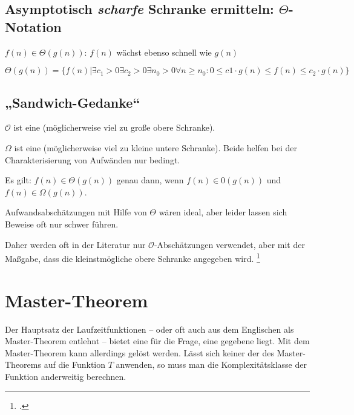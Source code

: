 \documentclass{lehramt-informatik-haupt}
\begin{document}
\subsection{Asymptotisch \emph{scharfe} Schranke ermitteln: $\Theta$-Notation}

\begin{compactitem}
\item $f(n) \in \Theta(g(n))$: $f(n)$ wächst ebenso schnell wie $g(n)$
\item $\Theta(g(n)) = \{f(n) |
\exists c_1 > 0
\exists c_2 > 0
\exists n_0 > 0
\forall n \geq n_0 :
 0 \leq c 1 \cdot g(n) \leq f(n) \leq c_2 \cdot g(n) \}$
\end{compactitem}

\subsection{„Sandwich-Gedanke“}

\begin{compactitem}
\item  $\mathcal{O}$ ist eine (möglicherweise viel zu große obere
Schranke).

\item  $\Omega$ ist eine (möglicherweise viel zu kleine untere
Schranke). Beide helfen bei der Charakterisierung von Aufwänden nur
bedingt.

\item  Es gilt: $f(n) \in \Theta(g(n))$ genau dann, wenn $f(n) \in
\mathcal{0}(g(n))$ und $f(n) \in \Omega(g(n))$.

\item  Aufwandsabschätzungen mit Hilfe von $\Theta$ wären ideal, aber
leider lassen sich Beweise oft nur schwer führen.
\end{compactitem}

Daher werden oft in der Literatur nur $\mathcal{O}$-Abschätzungen
verwendet, aber mit der Maßgabe, dass die kleinstmögliche obere Schranke
angegeben wird.
\footcite[Seite 37 (PDF 26)]{aud:fs:2}
%

\section{Master-Theorem}

Der Hauptsatz der Laufzeitfunktionen – oder oft auch aus dem Englischen
als Master-Theorem entlehnt – bietet eine  für
die Frage,  eine gegebene
 liegt. Mit dem Master-Theorem kann
allerdings  gelöst
werden. Lässt sich keiner der  des
Master-Theorems auf die Funktion $T$ anwenden, so muss man die
Komplexitätsklasse der Funktion anderweitig berechnen.
\end{document}

